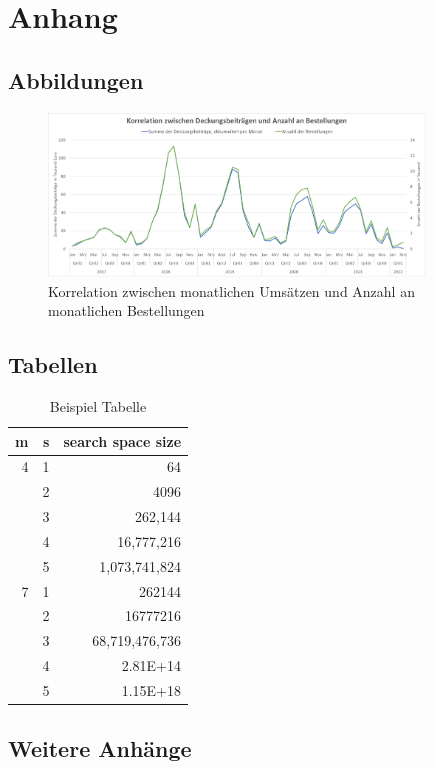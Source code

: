 \section{Anhang}\label{Anhang}


\subsection{Abbildungen}

\begin{figure}[h]
  	\begin{center}
 		\includegraphics[width=10cm]{graphics/chart}
 	\end{center}
	\caption{Korrelation zwischen monatlichen Umsätzen und Anzahl an monatlichen Bestellungen}\label{fig:chart}
\end{figure}

\subsection{Tabellen}
\begin{table}[h]
\centering
\label{tab:sizeSearchSpace}
 \begin{tabular}{r|r|r}
      m&s&search space size\\
      \hline
      4&1&64\\
      &2&4096\\
      &3&262,144\\
      &4&16,777,216\\
      &5&1,073,741,824\\
      7&1&262144\\
      &2&16777216\\
      &3&68,719,476,736\\
      &4&2.81E+14\\
      &5&1.15E+18\\
\end{tabular}
\caption{Beispiel Tabelle}
\end{table}

\subsection{Weitere Anhänge}
